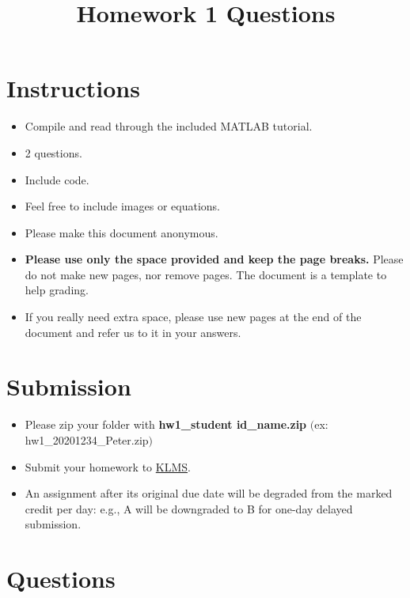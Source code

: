 \documentclass[11pt]{article}
\date{}
\title{\vspace{-1cm}Homework 1 Questions}
\begin{document}
\maketitle
\vspace{-2cm}
\thispagestyle{fancy}

\section*{Instructions}
\begin{itemize}
  \item Compile and read through the included MATLAB tutorial.
  \item 2 questions.
  \item Include code.
  \item Feel free to include images or equations.
  \item Please make this document anonymous.
  \item \textbf{Please use only the space provided and keep the page breaks.} Please do not make new pages, nor remove pages. The document is a template to help grading.
  \item If you really need extra space, please use new pages at the end of the document and refer us to it in your answers.
\end{itemize}


\section*{Submission}
\begin{itemize}
    \item Please zip your folder with \textbf{hw1\_student id\_name.zip} $($ex: hw1\_20201234\_Peter.zip$)$
    \item Submit your homework to \href{http://klms.kaist.ac.kr/course/view.php?id=109597}{KLMS}.
    \item An assignment after its original due date will be degraded from the marked credit per day: e.g., A will be downgraded to B for one-day delayed submission.
\end{itemize}

\pagebreak


\section*{Questions}



\end{document}
